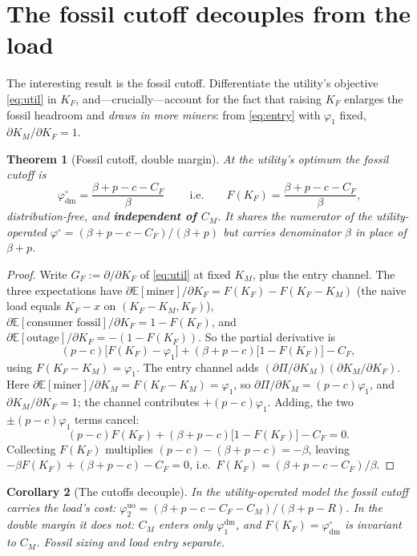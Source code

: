 \documentclass[11pt,reqno]{amsart}
\theoremstyle{plain}\newtheorem{theorem}{Theorem}\newtheorem{proposition}[theorem]{Proposition}
\newtheorem{corollary}[theorem]{Corollary}
\theoremstyle{remark}\newtheorem{remark}[theorem]{Remark}\newtheorem{observation}[theorem]{Observation}
\newcommand{\KR}{K_R}\newcommand{\KF}{K_F}\newcommand{\KM}{K_M}
\newcommand{\CM}{C_M}\newcommand{\CF}{C_F}\newcommand{\CR}{C_R}
\newcommand{\phio}{\varphi^{\circ}}\newcommand{\FKR}{F_{\KR}}\newcommand{\Dbar}{\bar D}
\newcommand{\E}{\mathbb{E}}\newcommand{\bp}{\beta+p}
\begin{document}
\section{The fossil cutoff decouples from the load}
The interesting result is the fossil cutoff. Differentiate the utility's objective
\eqref{eq:util} in $\KF$, and---crucially---account for the fact that raising $\KF$ enlarges
the fossil headroom and \emph{draws in more miners}: from \eqref{eq:entry} with $\varphi_1$
fixed, $\partial\KM/\partial\KF=1$.

\begin{theorem}[Fossil cutoff, double margin]\label{thm:phiodm}
At the utility's optimum the fossil cutoff is
\[
  \boxed{\ \phio_{\mathrm{dm}}=\frac{\bp-c-\CF}{\beta}\ }
  \qquad\text{i.e.}\qquad F(\KF)=\frac{\bp-c-\CF}{\beta},
\]
distribution-free, and \textbf{independent of $\CM$}. It shares the numerator of the
utility-operated $\phio=(\bp-c-\CF)/(\bp)$ but carries denominator $\beta$ in place of $\bp$.
\end{theorem}
\begin{proof}
Write $G_F:=\partial/\partial\KF$ of \eqref{eq:util} at fixed $\KM$, plus the entry channel.
The three expectations have
$\partial\E[\text{miner}]/\partial\KF=F(\KF)-F(\KF-\KM)$ (the naive load equals $\KF-x$ on
$(\KF-\KM,\KF)$), $\partial\E[\text{consumer fossil}]/\partial\KF=1-F(\KF)$, and
$\partial\E[\text{outage}]/\partial\KF=-(1-F(\KF))$. So the partial derivative is
\[
  (p-c)\big[F(\KF)-\varphi_1\big]+(\bp-c)\big[1-F(\KF)\big]-\CF ,
\]
using $F(\KF-\KM)=\varphi_1$. The entry channel adds $(\partial\Pi/\partial\KM)(\partial\KM/\partial\KF)$.
Here $\partial\E[\text{miner}]/\partial\KM=F(\KF-\KM)=\varphi_1$, so
$\partial\Pi/\partial\KM=(p-c)\varphi_1$, and $\partial\KM/\partial\KF=1$; the channel
contributes $+(p-c)\varphi_1$. Adding, the two $\pm(p-c)\varphi_1$ terms cancel:
\[
  (p-c)F(\KF)+(\bp-c)\big[1-F(\KF)\big]-\CF=0 .
\]
Collecting $F(\KF)$ multiplies $(p-c)-(\bp-c)=-\beta$, leaving
$-\beta F(\KF)+(\bp-c)-\CF=0$, i.e.\ $F(\KF)=(\bp-c-\CF)/\beta$.
\end{proof}

\begin{corollary}[The cutoffs decouple]\label{cor:decouple}
In the utility-operated model the fossil cutoff carries the load's cost:
$\varphi_2^{\mathrm{uo}}=(\bp-c-\CF-\CM)/(\bp-R)$. In the double margin it does not:
$\CM$ enters only $\varphi_1^{\mathrm{dm}}$, and $F(\KF)=\phio_{\mathrm{dm}}$ is invariant to
$\CM$. Fossil sizing and load entry separate.
\end{corollary}
\end{document}

